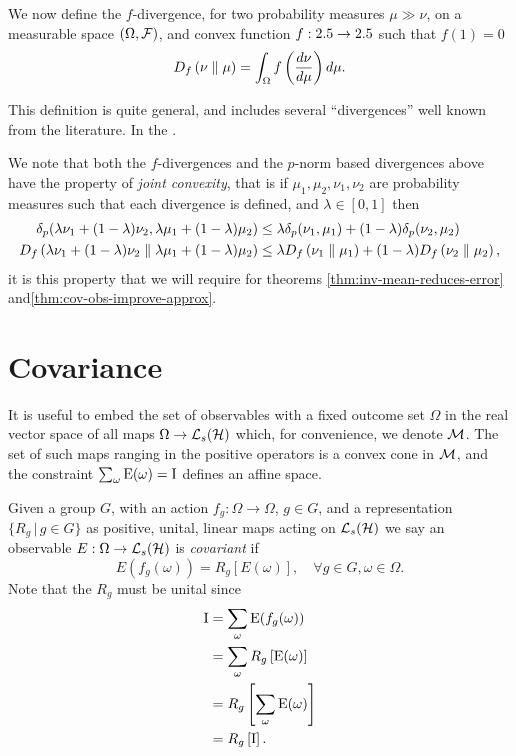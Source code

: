 We now define the $f$-divergence, for two probability measures $\mu\gg\nu$, on a measurable space $(\Omega, \mathcal{F})$, and convex function $f:2.5\to2.5$ such that $f(1) = 0$
\begin{align}\label{eqn:f-div-defn}
  D_{f}\left({\nu}\parallel{\mu}\right) = \int_\Omega f\left(\frac{d\nu}{d\mu}\right) d\mu.
\end{align}

This definition is quite general, and includes several ``divergences'' well known from the literature. In the . 

We note that both the $f$-divergences and the $p$-norm based divergences above have the property of \emph{joint convexity}, that is if $\mu_1, \mu_2, \nu_1,\nu_2$ are probability measures such that each divergence is defined, and $\lambda\in [0,1]$ then
\begin{align}
  \delta_p(\lambda\nu_1 + (1-\lambda)\nu_2, \lambda\mu_1 + (1-\lambda)\mu_2) &\leq \lambda \delta_p(\nu_1, \mu_1) + (1-\lambda)\delta_p(\nu_2, \mu_2)\\
  D_{f}\left({\lambda\nu_1 + (1-\lambda)\nu_2}\parallel{\lambda\mu_1 + (1-\lambda)\mu_2}\right) &\leq  \lambda D_{f}\left({\nu_1}\parallel{\mu_1}\right) + (1-\lambda)D_{f}\left({\nu_2}\parallel{\mu_2}\right),
\end{align}
it is this property that we will require for theorems \ref{thm:inv-mean-reduces-error} and\ref{thm:cov-obs-improve-approx}.
\section{Covariance}
\label{sec:covariance}

It is useful to embed the set of observables with a fixed outcome set $\Omega$ in the real vector space of all maps $\Omega\to \saops[\hcal]$ which, for convenience, we denote $\mathcal{M}$. The set of such maps ranging in the positive operators is a convex cone in $\mathcal{M}$, and the constraint $\sum_\omega\operatorname{E}(\omega) = \operatorname{I}$ defines an affine space.

Given a group $G$, with an action $f_g:\Omega\to\Omega$, $g\in G$, and a representation $\{R_g\, | \, g\in G\}$ as positive, unital, linear maps acting on $\saops[\hcal]$ we say an observable $E:\Omega\to\saops[\hcal]$ is \emph{covariant} if
\begin{equation}
  E(f_g(\omega)) = R_g \left[E(\omega)\right], \quad \forall g\in G, \omega\in\Omega.
\end{equation}
Note that the $R_g$ must be unital since
\begin{align}
  \operatorname{I} &= \sum_\omega \operatorname{E}(f_g(\omega))\\
       &= \sum_\omega R_g\left[\operatorname{E}(\omega)\right]\\
       &= R_g\left[ \sum_\omega \operatorname{E}(\omega)\right]\\
       &= R_g\left[ \operatorname{I}\right].
\end{align}

